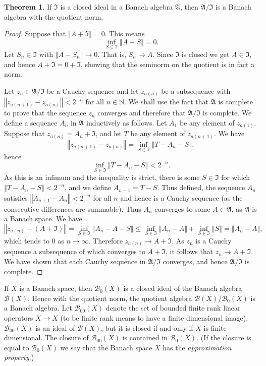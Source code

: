 \documentclass{article}
\newcommand{\norm}[1]{\left\Vert #1 \right\Vert}
\theoremstyle{definition}
\newtheorem{theorem}{Theorem}
\theoremstyle{definition}
\begin{document}
\begin{theorem}
If $\mathfrak{I}$ is a closed ideal in a Banach algebra $\mathfrak{A}$, then
$\mathfrak{A} / \mathfrak{I}$ is a Banach algebra with the quotient norm.
\end{theorem}
\begin{proof}
Suppose that $\norm{A+\mathfrak{I}}=0$. This means
\[
\inf_{S \in \mathfrak{I}} \norm{A-S} = 0.
\]
Let $S_n \in \mathfrak{I}$ with $\norm{A-S_n} \to 0$. That is, $S_n \to A$. Since $\mathfrak{I}$ is closed we get $A \in \mathfrak{I}$, and hence
$A+\mathfrak{I} = 0 + \mathfrak{I}$, showing that the seminorm on the quotient is in fact a norm.

Let $z_n \in \mathfrak{A} / \mathfrak{I}$ be a Cauchy sequence and let $z_{a(n)}$ be a subsequence with $\norm{z_{a(n+1)}-z_{a(n)}}<2^{-n}$ for all $n \in \mathbb{N}$.
We shall use the fact that $\mathfrak{A}$ is complete to prove that the sequence $z_n$ converges
and therefore that $\mathfrak{A}/\mathfrak{I}$ is complete.
We define a sequence $A_n$ in $\mathfrak{A}$ inductively as follows.
Let $A_1$ be any element of $z_{a(1)}$. 
Suppose that $z_{a(n)}=A_n+\mathfrak{I}$, and let $T$ be any element of $z_{a(n+1)}$. We have
\[
\norm{z_{a(n+1)}-z_{a(n)}} = \inf_{S \in \mathfrak{I}} \norm{T-A_n-S},
\]
hence
\[
 \inf_{S \in \mathfrak{I}} \norm{T-A_n-S}<2^{-n}.
\]
As this is an infimum and the inequality is strict, there is some $S \in \mathfrak{I}$ for which $\norm{T-A_n-S}< 2^{-n}$, and we define $A_{n+1}=T-S$. Thus defined, the sequence $A_n$ satisfies
$\norm{A_{n+1}-A_n}<2^{-n}$ for all $n$ and hence is a Cauchy sequence (as the consecutive differences are summable). Thus $A_n$ converges to some $A \in
\mathfrak{A}$, as $\mathfrak{A}$ is a Banach space. We have
\[
\norm{z_{a(n)}-(A+\mathfrak{I})} = \inf_{S \in \mathfrak{I}} \norm{A_n-A-S} \leq \inf_{S \in \mathfrak{I}} \norm{A_n-A} + \inf_{S \in \mathfrak{I}} \norm{S}=
\norm{A_n-A},
\]
which tends to $0$ as $n \to \infty$. Therefore $z_{a(n)} \to A+\mathfrak{I}$. As $z_n$ is a Cauchy sequence a subsequence of which converges
to $A+\mathfrak{I}$, it follows that $z_n \to A+\mathfrak{I}$. We have shown that each Cauchy sequence in $\mathfrak{A}/\mathfrak{I}$ converges, and hence
$\mathfrak{A} / \mathfrak{I}$ is complete.
\end{proof}

If $X$ is a Banach space, then
 $\mathscr{B}_0(X)$ is a closed ideal of the Banach algebra $\mathscr{B}(X)$.
Hence with the quotient norm, the  quotient algebra $\mathscr{B}(X) / \mathscr{B}_0(X)$ is a Banach algebra.
Let $\mathscr{B}_{00}(X)$ denote the set of bounded finite rank linear operators $X \to X$ (to be finite rank means to have a finite dimensional image).
$\mathscr{B}_{00}(X)$ is an ideal of $\mathscr{B}(X)$, but it is closed if and only if $X$ is finite dimensional. The closure of $\mathscr{B}_{00}(X)$ is contained in 
$\mathscr{B}_0(X)$. (If the closure is equal to $\mathscr{B}_0(X)$ we say that the Banach space $X$ has the {\em approximation property}.)
\end{document}
